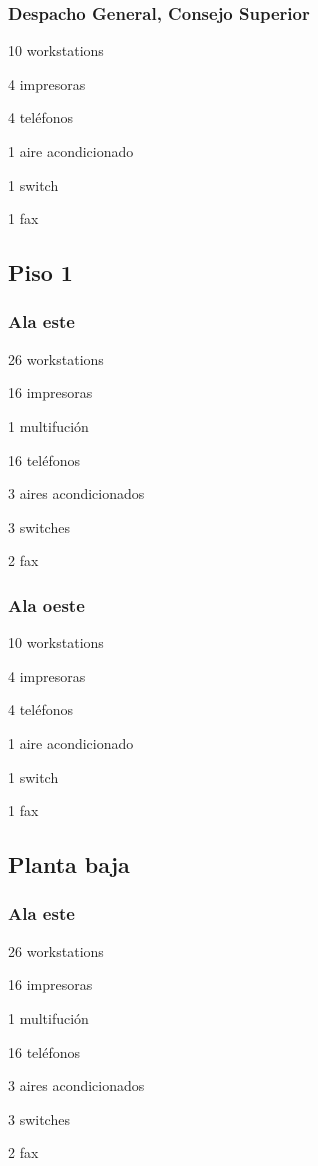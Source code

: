 \documentclass[a4paper,11pt,oneside]{article}
\begin{document}
\subsubsection*{Despacho General, Consejo Superior}
\begin{itemize*}
\item 10 workstations
\item 4 impresoras
\item 4 teléfonos
\item 1 aire acondicionado
\item 1 switch
\item 1 fax
\end{itemize*}
%
\subsection*{Piso 1}
%
\subsubsection*{Ala este}
\begin{itemize*}
\item 26 workstations
\item 16 impresoras
\item 1 multifución
\item 16 teléfonos
\item 3 aires acondicionados
\item 3 switches
\item 2 fax
\end{itemize*}
%
\subsubsection*{Ala oeste}
\begin{itemize*}
\item 10 workstations
\item 4 impresoras
\item 4 teléfonos
\item 1 aire acondicionado
\item 1 switch
\item 1 fax
\end{itemize*}
%
\subsection*{Planta baja}
%
\subsubsection*{Ala este}
\begin{itemize*}
\item 26 workstations
\item 16 impresoras
\item 1 multifución
\item 16 teléfonos
\item 3 aires acondicionados
\item 3 switches
\item 2 fax
\end{itemize*}
%
\end{document}

